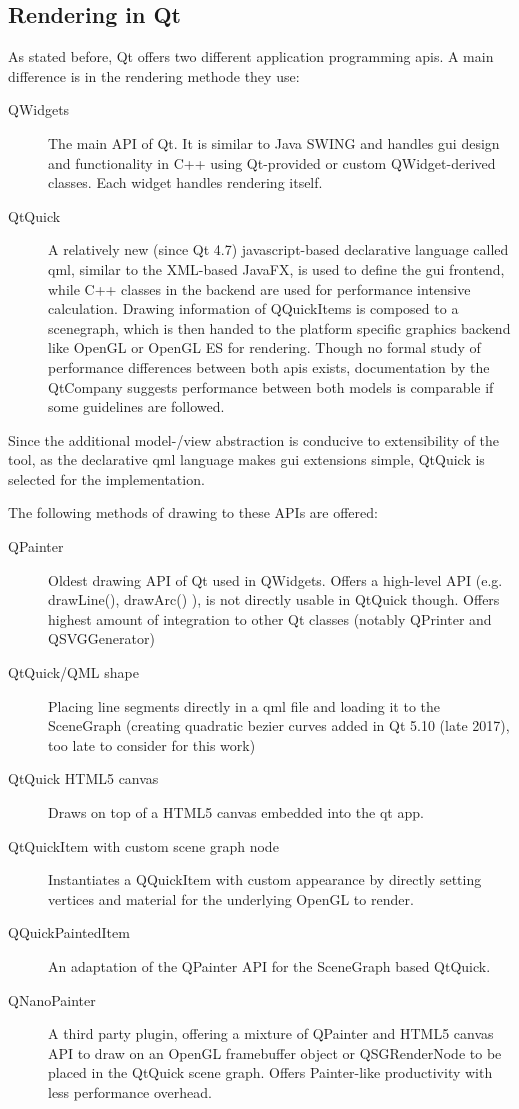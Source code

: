\subsection{Rendering in Qt}
\label{sec:qtrender}
As stated before, Qt offers two different application programming \gls{api}s. A main difference is in the rendering methode they use:
\begin{description}
	\item [QWidgets] The main API of Qt. It is similar to Java SWING and handles \gls{gui} design and functionality in C++ using Qt-provided or custom QWidget-derived classes. Each widget handles rendering itself.
	\item [QtQuick] A relatively new (since Qt 4.7) javascript-based declarative language called \gls{qml}, similar to the XML-based JavaFX, is used to define the \gls{gui} frontend, while C++ classes in the backend are used for performance intensive calculation. Drawing information of QQuickItems is composed to a scenegraph, which is then handed to the platform specific graphics backend like OpenGL or OpenGL ES for rendering. Though no formal study of performance differences between both \gls{api}s exists, documentation by the QtCompany suggests performance between both models is comparable if some guidelines are followed.
\end{description}

Since the additional model-/view abstraction is conducive to extensibility of the tool, as the declarative \gls{qml} language makes \gls{gui} extensions simple, QtQuick is selected for the implementation.

The following methods of drawing to these APIs are offered:
\begin{description}
	\item [QPainter] Oldest drawing API of Qt used in QWidgets. Offers a high-level API (e.g. drawLine(), drawArc() ), is not directly usable in QtQuick though. Offers highest amount of integration to other Qt classes (notably QPrinter and QSVGGenerator)
	\item [QtQuick/QML shape] Placing line segments directly in a \gls{qml} file and loading it to the SceneGraph (creating quadratic bezier curves added in Qt 5.10 (late 2017), too late to consider for this work)
	\item [QtQuick HTML5 canvas] Draws on top of a HTML5 canvas embedded into the qt app.
	\item [QtQuickItem with custom scene graph node] Instantiates a QQuickItem with custom appearance by directly setting vertices and material for the underlying OpenGL to render.
	\item [QQuickPaintedItem] An adaptation of the QPainter API for the SceneGraph based QtQuick. 
	\item [QNanoPainter] A third party plugin, offering a mixture of QPainter and HTML5 canvas API to draw on an OpenGL framebuffer object or QSGRenderNode to be placed in the QtQuick scene graph. Offers Painter-like productivity with less performance overhead.
\end{description}

